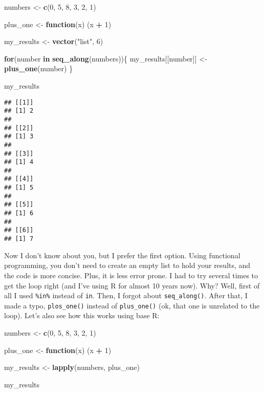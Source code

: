 \documentclass[
]{article}
\newenvironment{Shaded}{\begin{snugshade}}{\end{snugshade}}
\newcommand{\ControlFlowTok}[1]{\textcolor[rgb]{0.13,0.29,0.53}{\textbf{#1}}}
\newcommand{\DecValTok}[1]{\textcolor[rgb]{0.00,0.00,0.81}{#1}}
\newcommand{\KeywordTok}[1]{\textcolor[rgb]{0.13,0.29,0.53}{\textbf{#1}}}
\newcommand{\NormalTok}[1]{#1}
\newcommand{\OperatorTok}[1]{\textcolor[rgb]{0.81,0.36,0.00}{\textbf{#1}}}
\newcommand{\StringTok}[1]{\textcolor[rgb]{0.31,0.60,0.02}{#1}}
\begin{document}
\begin{Shaded}
\begin{Highlighting}[]
\NormalTok{numbers \textless{}{-}}\StringTok{ }\KeywordTok{c}\NormalTok{(}\DecValTok{0}\NormalTok{, }\DecValTok{5}\NormalTok{, }\DecValTok{8}\NormalTok{, }\DecValTok{3}\NormalTok{, }\DecValTok{2}\NormalTok{, }\DecValTok{1}\NormalTok{)}

\NormalTok{plus\_one \textless{}{-}}\StringTok{ }\ControlFlowTok{function}\NormalTok{(x) (x }\OperatorTok{+}\StringTok{ }\DecValTok{1}\NormalTok{)}

\NormalTok{my\_results \textless{}{-}}\StringTok{ }\KeywordTok{vector}\NormalTok{(}\StringTok{"list"}\NormalTok{, }\DecValTok{6}\NormalTok{)}

\ControlFlowTok{for}\NormalTok{(number }\ControlFlowTok{in} \KeywordTok{seq\_along}\NormalTok{(numbers))\{}
\NormalTok{  my\_results[[number]] \textless{}{-}}\StringTok{ }\KeywordTok{plus\_one}\NormalTok{(number)}
\NormalTok{\}}

\NormalTok{my\_results}
\end{Highlighting}
\end{Shaded}

\begin{verbatim}
## [[1]]
## [1] 2
## 
## [[2]]
## [1] 3
## 
## [[3]]
## [1] 4
## 
## [[4]]
## [1] 5
## 
## [[5]]
## [1] 6
## 
## [[6]]
## [1] 7
\end{verbatim}

Now I don't know about you, but I prefer the first option. Using functional programming, you don't
need to create an empty list to hold your results, and the code is more concise. Plus,
it is less error prone. I had to try several times to get the loop right
(and I've using R for almost 10 years now). Why? Well, first of all I used \texttt{\%in\%} instead of \texttt{in}.
Then, I forgot about \texttt{seq\_along()}. After that, I made a typo, \texttt{plos\_one()} instead of \texttt{plus\_one()}
(ok, that one is unrelated to the loop). Let's also see how this works using base R:

\begin{Shaded}
\begin{Highlighting}[]
\NormalTok{numbers \textless{}{-}}\StringTok{ }\KeywordTok{c}\NormalTok{(}\DecValTok{0}\NormalTok{, }\DecValTok{5}\NormalTok{, }\DecValTok{8}\NormalTok{, }\DecValTok{3}\NormalTok{, }\DecValTok{2}\NormalTok{, }\DecValTok{1}\NormalTok{)}

\NormalTok{plus\_one \textless{}{-}}\StringTok{ }\ControlFlowTok{function}\NormalTok{(x) (x }\OperatorTok{+}\StringTok{ }\DecValTok{1}\NormalTok{)}

\NormalTok{my\_results \textless{}{-}}\StringTok{ }\KeywordTok{lapply}\NormalTok{(numbers, plus\_one)}

\NormalTok{my\_results}
\end{Highlighting}
\end{Shaded}
\end{document}
